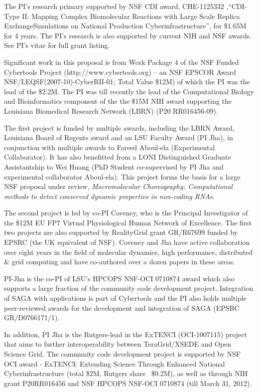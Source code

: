 \documentclass[a4paper,11pt]{article}
\begin{document}
The PI's research primary supported by NSF CDI award, CHE-1125332
,``CDI-Type II: Mapping Complex Biomolecular Reactions with Large
Scale Replica ExchangeSimulations on National Production
Cyberinfrastructure'', for \$1.65M for 4 years. The PI's research is
also supported by current NIH and NSF awards.  See PI's vitae for full
grant listing.

Significant work in this proposal is from Work Package 4 of the NSF Funded Cybertools Project (http://www.cybertools.org) -- an NSF EPSCOR Award NSF/LEQSF(2007-10)-CyberRII-01; Total Value \$12M) of which the PI was the lead of the \$2.2M. The PI was till recently the lead of the Computational Biology and Bioinformatics component of the the \$15M NIH award supporting the Louisiana Biomedical Research Network (LBRN) (P20 RR016456-09). %

The first project is funded by multiple awards, including the LBRN Award, Louisiana Board of Regents award and an LSU Faculty Award (PI Jha), in conjunction with multiple awards to Fareed Aboul-ela (Experimental Collaborator). It has also benefitted from a LONI Distinguished Graduate Assistantship to Wei Huang (PhD Student co-supervised by PI Jha and experimental collaborator Aboul-ela). This project forms the basis for a large NSF proposal under review, {\it Macromolecular Choreography: Computational methods to detect conserved dynamic properties in non-coding RNAs}.

The second project is led by co-PI Coveney, who is the Principal Investigator of the \$12M EU FP7 Virtual Physiological Human Network of Excellence. The first two projects are also supported by RealityGrid grant GR/R67699 funded by EPSRC (the UK equivalent of NSF). Coveney and Jha have active collaboration over eight years in the field of molecular dynamics, high performance, distributed \& grid computing and have co-authored over a dozen papers in these areas.
 
PI-Jha is the co-PI of LSU's HPCOPS NSF-OCI 0710874 award which also supports a large fraction of the community code development project. Integration of SAGA with applications is part of Cybertools and the PI also holds multiple peer-reviewed awards for the development and integration of SAGA (EPSRC GR/D0766171/1). %

In addition, PI Jha is the Rutgers-lead in the ExTENCI (OCI-1007115) project that aims to further interoperability between TeraGrid/XSEDE and Open Science Grid.  The community code development project is supported by NSF OCI award - ExTENCI: Extending Science Through Enhanced National Cyberinfrastructure (total \$2M, Rutgers share ~\$0.2M), as well as through NIH grant P20RR016456 and NSF HPCOPS NSF-OCI 0710874 (till March 31, 2012). 
\end{document}
